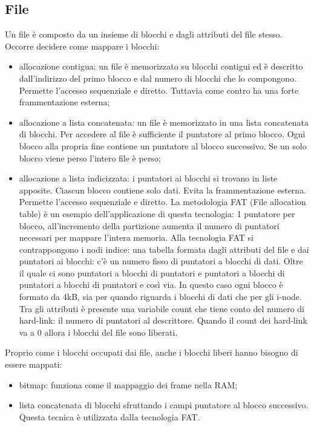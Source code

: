 \documentclass{article}
\begin{document}
\subsection{File}
Un file è composto da un insieme di blocchi e dagli attributi del file stesso. Occorre decidere come mappare i blocchi:
\begin{itemize}
	\item allocazione contigua: un file è memorizzato su blocchi contigui ed è descritto dall'indirizzo del primo blocco e dal numero di blocchi che lo compongono. Permette l'accesso sequenziale e diretto. Tuttavia come contro ha una forte frammentazione esterna;

	\item allocazione a lista concatenata: un file è memorizzato in una lista concatenata di blocchi. Per accedere al file è sufficiente il puntatore al primo blocco. Ogni blocco alla propria fine contiene un puntatore al blocco successivo. Se un solo blocco viene perso l'intero file è perso;

	\item allocazione a lista indicizzata: i puntatori ai blocchi si trovano in liste apposite. Ciascun blocco contiene solo dati. Evita la frammentazione esterna. Permette l'accesso sequenziale e diretto. La metodologia FAT (File allocation table) è un esempio dell'applicazione di questa tecnologia: 1 puntatore per blocco, all'incremento della partizione aumenta il numero di puntatori necessari per mappare l'intera memoria. Alla tecnologia FAT si contrappongono i nodi indice: una tabella formata dagli attributi del file e dai puntatori ai blocchi: c'è un numero fisso di puntatori a blocchi di dati. Oltre il quale ci sono puntatori a blocchi di puntatori e puntatori a blocchi di puntatori a blocchi di puntatori e così via. In questo caso ogni blocco è formato da 4kB, sia per quando riguarda i blocchi di dati che per gli i-node.\\
	Tra gli attributi è presente una variabile count che tiene conto del numero di hard-link: il numero di puntatori al descrittore. Quando il count dei hard-link va a 0 allora i blocchi del file sono liberati.
\end{itemize}

Proprio come i blocchi occupati dai file, anche i blocchi liberi hanno bisogno di essere mappati: 
\begin{itemize}
	\item bitmap: funziona come il mappaggio dei frame nella RAM;

	\item lista concatenata di blocchi sfruttando i campi puntatore al blocco successivo. Questa tecnica è utilizzata dalla tecnologia FAT.
\end{itemize}
\end{document}

